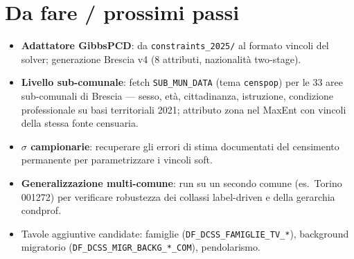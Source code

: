 \documentclass[11pt,a4paper]{article}
\newcommand{\code}[1]{\texttt{#1}}
\newcommand{\flow}[1]{\texttt{\small #1}}
\begin{document}
\section{Da fare / prossimi passi}
\begin{itemize}[leftmargin=*]
  \item[$\square$] \textbf{Adattatore GibbsPCD}: da \code{constraints\_2025/} al
  formato vincoli del solver; generazione Brescia v4 (8 attributi, nazionalit\`a
  two-stage).
  \item[$\square$] \textbf{Livello sub-comunale}: fetch \flow{SUB\_MUN\_DATA}
  (tema \code{censpop}) per le 33 aree sub-comunali di Brescia --- sesso, et\`a,
  cittadinanza, istruzione, condizione professionale su basi territoriali 2021;
  attributo zona nel MaxEnt con vincoli della stessa fonte censuaria.
  \item[$\square$] \textbf{$\sigma$ campionarie}: recuperare gli errori di stima
  documentati del censimento permanente per parametrizzare i vincoli soft.
  \item[$\square$] \textbf{Generalizzazione multi-comune}: run su un secondo
  comune (es.\ Torino 001272) per verificare robustezza dei collassi label-driven
  e della gerarchia condprof.
  \item[$\square$] Tavole aggiuntive candidate: famiglie
  (\flow{DF\_DCSS\_FAMIGLIE\_TV\_*}), background migratorio
  (\flow{DF\_DCSS\_MIGR\_BACKG\_*\_COM}), pendolarismo.
\end{itemize}
\end{document}
